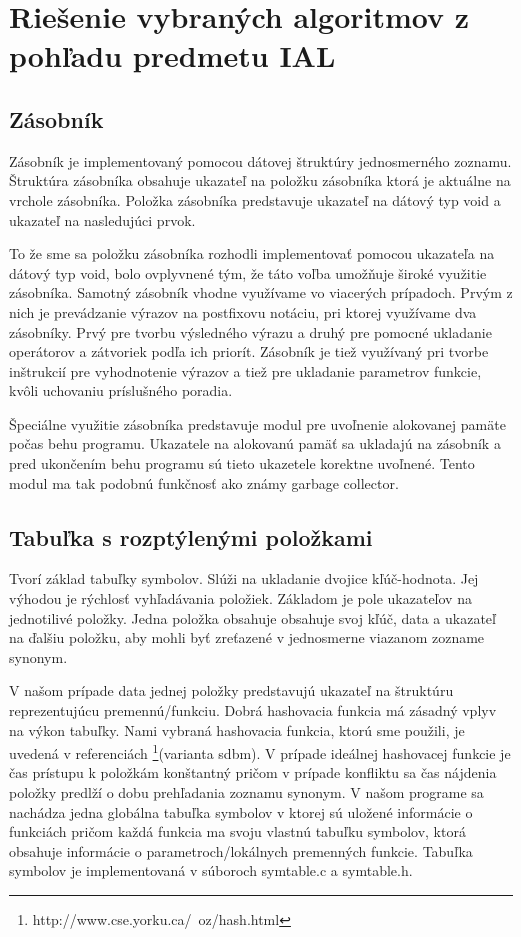 \documentclass[11pt,a4paper]{article}
\begin{document}
\section{Riešenie vybraných algoritmov z pohľadu predmetu IAL}
	
	\subsection{Zásobník}
	Zásobník je implementovaný pomocou dátovej štruktúry jednosmerného zoznamu. Štruktúra zásobníka obsahuje ukazateľ na položku zásobníka ktorá je aktuálne na vrchole zásobníka. Položka zásobníka predstavuje ukazateľ na dátový typ void a ukazateľ na nasledujúci prvok.

	To že sme sa položku zásobníka rozhodli implementovať pomocou ukazateľa na dátový typ void, bolo ovplyvnené tým, že táto voľba umožňuje široké využitie zásobníka. Samotný zásobník vhodne využívame vo viacerých prípadoch. Prvým z nich je prevádzanie výrazov na postfixovu notáciu, pri ktorej využívame dva zásobníky. Prvý pre tvorbu výsledného výrazu a druhý pre pomocné ukladanie operátorov a zátvoriek podľa ich priorít. Zásobník je tiež využívaný pri tvorbe inštrukcií pre vyhodnotenie výrazov a tiež pre ukladanie parametrov funkcie, kvôli uchovaniu príslušného poradia.
	
	Špeciálne využitie zásobníka predstavuje modul pre uvoľnenie alokovanej pamäte počas behu programu. Ukazatele na alokovanú pamäť sa ukladajú na zásobník a pred ukončením behu programu sú tieto ukazetele korektne uvoľnené. Tento modul ma tak podobnú funkčnosť ako známy garbage collector.

	\subsection{Tabuľka s rozptýlenými položkami}
	Tvorí základ tabuľky symbolov. Slúži na ukladanie dvojice kľúč-hodnota. Jej výhodou je rýchlosť vyhľadávania položiek. Základom je pole 
	ukazateľov na jednotilivé položky. Jedna položka obsahuje obsahuje svoj kľúč, data a ukazateľ na ďalšiu položku, aby mohli byť zreťazené 
	v jednosmerne viazanom zozname synonym.

	V našom prípade data jednej položky predstavujú ukazateľ na štruktúru reprezentujúcu 
	premennú/funkciu. Dobrá hashovacia funkcia má zásadný vplyv na výkon tabuľky. Nami vybraná hashovacia funkcia, ktorú sme použili, je 
	uvedená v referenciách \footnote{http://www.cse.yorku.ca/~oz/hash.html}(varianta sdbm). V prípade ideálnej hashovacej funkcie je čas prístupu k položkám konštantný pričom v prípade 
	konfliktu sa čas nájdenia položky predlží o dobu prehľadania zoznamu synonym.
	V našom programe sa nachádza jedna globálna tabuľka symbolov v ktorej sú uložené informácie o funkciách pričom každá funkcia ma svoju 
	vlastnú tabuľku symbolov, ktorá obsahuje informácie o parametroch/lokálnych premenných funkcie. 
	Tabuľka symbolov je implementovaná v súboroch symtable.c a symtable.h.
\end{document}
